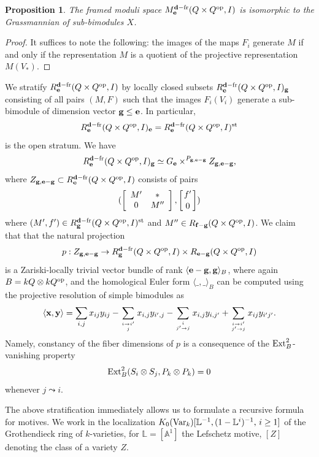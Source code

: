\documentclass[12pt,a4paper]{amsart}
\numberwithin{equation}{section}
\newtheorem{prop}[thm]{Proposition}
\theoremstyle{remark}
\begin{document}
\begin{prop}
The framed moduli space  $M_{\bf e}^{{\bf d}-{\rm fr}}(Q\times Q^{\rm op},I)$ is isomorphic 
to the Grassmannian of sub-bimodules $X$.
\end{prop}
\begin{proof}
It suffices to note the following: the images of the maps $F_i$ generate $M$ 
if and only if the representation $M$ is a quotient of the projective 
representation $M(V_*)$.
\end{proof}

We stratify $R_{\bf e}^{{\bf d}-{\rm fr}}(Q\times Q^{\rm op},I)$ by locally closed subsets 
$R_{\bf e}^{{\bf d}-{\rm fr}}(Q\times Q^{\rm op},I)_{\bf g}$ consisting of all pairs $(M,F)$
such that the images $F_i(V_i)$ generate a sub-bimodule of dimension vector 
${\bf g}\leq{\bf e}$. In particular, 
$$R_{\bf e}^{{\bf d}-{\rm fr}}(Q\times Q^{\rm op},I)_{\bf e}=R_{\bf e}^{{\bf d}-{\rm fr}}(Q\times Q^{\rm op},I)^{\rm st}$$ is the open stratum. We have
$$R_{\bf e}^{{\bf d}-{\rm fr}}(Q\times Q^{\rm op},I)_{\bf g}\simeq G_{\bf e}\times^{P_{{\bf g},{\bf e}-{\bf g}}}Z_{{\bf g},{\bf e}-{\bf g}},$$
where $Z_{{\bf g},{\bf e}-{\bf g}}\subset R_{\bf e}^{{\bf d}-{\rm fr}}(Q\times Q^{\rm op},I)$ consists of pairs
$$(\left[\begin{array}{cc}M'&*\\ 0&M''\end{array}\right],\left[{f'\atop 0}\right])$$
where $(M',f')\in R_{\bf g}^{{\bf d}-{\rm fr}}(Q\times Q^{\rm op},I)^{\rm st}$
and $M''\in R_{{\bf f}-{\bf g}}(Q\times Q^{\rm op},I)$. We claim that that the natural projection
$$p:Z_{{\bf g},{\bf e}-{\bf g}}\rightarrow R_{\bf g}^{{\bf d}-{\rm fr}}(Q\times Q^{\rm op},I)\times R_{{\bf e}-{\bf g}}(Q\times Q^{\rm op},I)$$
is a Zariski-locally trivial vector bundle of rank $\langle{\bf e}-{\bf g},{\bf g}\rangle_B$,
where again $B=kQ\otimes kQ^{\rm op}$, and the homological Euler form 
$\langle\_,\_\rangle_B$ can be computed using the projective resolution of simple bimodules as
$$\langle{\bf x},{\bf y}\rangle=\sum_{i,j}{x}_{ij}{y}_{ij}-\sum_{{i\rightarrow i'}\atop j}x_{i,j}y_{i',j}-\sum_{i\atop{j'\rightarrow j}}x_{i,j}y_{i,j'}+\sum_{{i\rightarrow i'}\atop{j'\rightarrow j}}x_{ij}y_{i'j'}.$$
Namely, constancy of the fiber dimensions of $p$ is a consequence of the 
${\rm Ext}^2_B$-vanishing property
$${\rm Ext}_B^2(S_i\otimes S_j,P_k\otimes P_k)=0$$
whenever $j\leadsto i$.

The above stratification immediately allows us to formulate a recursive formula for motives. We work in the localization $K_0({\rm Var}_{k})[\mathbb{L}^{-1},(1-\mathbb{L}^i)^{-1},\, i\geq 1]$ of the Grothendieck ring of $k$-varieties, for $\mathbb{L}=[\mathbb{A}^1]$ the Lefschetz motive, $[Z]$ denoting the class of a variety $Z$.
\end{document}
